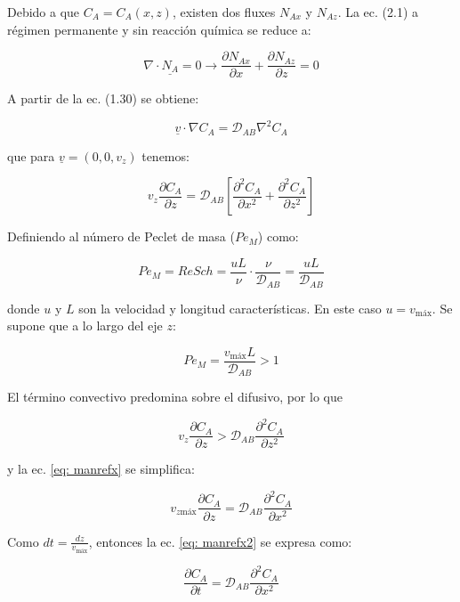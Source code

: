 Debido a que $C_A = C_A(x,z)$, existen dos fluxes $N_{Ax}$ y $N_{Az}$. La ec. (2.1) a régimen permanente y sin reacción química se reduce a:

\begin{equation}
	\nabla \cdot \underline{N_A} = 0 \to \frac{\partial N_{Ax}}{\partial x} + \frac{\partial N_{Az}}{\partial z} = 0
\end{equation}

A partir de la ec. (1.30) se obtiene:

$$	\underline{v} \cdot \nabla C_A = \mathscr{D}_{AB} \nabla^2 C_A $$

que para $\underline{v} = (0, 0, v_z)$ tenemos:

\begin{equation} \label{eq: manrefx}
	v_z \frac{\partial C_A}{\partial z} = \mathscr{D}_{AB} \left[ \frac{\partial^2 C_A}{\partial x^2} + \frac{\partial^2 C_A}{\partial z^2}  \right]
\end{equation}

Definiendo al número de Peclet de masa ($Pe_M$) como: 

\begin{equation}
	Pe_M = Re Sch = \frac{uL}{\nu} \cdot \frac{\nu}{\mathscr{D}_{AB}} = \frac{uL}{\mathscr{D}_{AB}}
\end{equation}

donde $u$ y $L$ son la velocidad y longitud características. En este caso $u = v_{\text{máx}}$. Se supone que a lo largo del eje $z$:

$$Pe_M = \frac{v_{\text{máx}} L}{\mathscr{D}_{AB}} > 1$$

El término convectivo predomina sobre el difusivo, por lo que

$$v_z \frac{\partial C_A}{\partial z} > \mathscr{D}_{AB} \frac{\partial^2 C_A}{\partial z^2}$$

y la ec. \eqref{eq: manrefx} se simplifica:

\begin{equation} \label{eq: manrefx2}
v_{z \text{máx}} \frac{\partial C_A}{\partial z} = \mathscr{D}_{AB} \frac{\partial^2 C_A}{\partial x^2}
\end{equation}

Como $dt = \frac{dz}{v_{\text{máx}}}$, entonces la ec. \eqref{eq: manrefx2} se expresa como:

\begin{equation} \label{eq: manrefx3}
	\frac{\partial C_A}{\partial t} = \mathscr{D}_{AB} \frac{\partial^2 C_A}{\partial x^2}
\end{equation}

